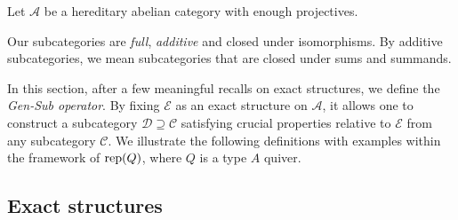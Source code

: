 \pagestyle{plain}

Let $\mathscr{A}$ be a hereditary abelian category with enough projectives. 

\begin{conv} \label{conv:addsubcat}
    Our subcategories are \emph{full}, \emph{additive} and closed under isomorphisms. By additive subcategories, we mean subcategories that are closed under sums and summands.
\end{conv}

In this section, after a few meaningful recalls on exact structures, we define the \emph{Gen-Sub operator}. By fixing $\mathcal{E}$ as an exact structure on $\mathscr{A}$, it allows one to construct a subcategory $\mathscr{D} \supseteq \mathscr{C}$ satisfying crucial properties relative to $\mathcal{E}$ from any subcategory $\mathscr{C}$. We illustrate the following definitions with examples within the framework of $\operatorname{rep} (Q)$, where $Q$ is a type $A$ quiver. 

\subsection{Exact structures}
\label{ss:genonexactstructure}


